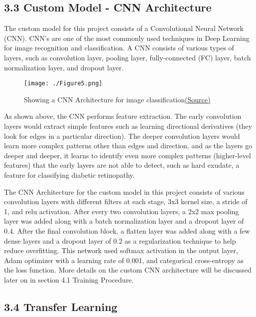\documentclass[
]{article}
\begin{document}
\hypertarget{custom-model---cnn-architecture}{%
\subsection{\texorpdfstring{\textbf{3.3 Custom Model - CNN
Architecture}}{3.3 Custom Model - CNN Architecture}}\label{custom-model---cnn-architecture}}

The custom model for this project consists of a Convolutional Neural
Network (CNN). CNN's are one of the most commonly used techniques in
Deep Learning for image recognition and classification. A CNN consists
of various types of layers, such as convolution layer, pooling layer,
fully-connected (FC) layer, batch normalization layer, and dropout
layer.

\begin{figure}[hbt!]
  \centering
  \texttt{[image: ./Figure5.png]}
  \caption{Showing a CNN Architecture for image classification\href{https://medium.com/techiepedia/binary-image-classifier-cnn-using-tensorflow-a3f5d6746697}{\underline{(Source)}}}
  \label{fig:figure5}
\end{figure}

As shown above, the CNN performs feature extraction. The early
convolution layers would extract simple features such as learning
directional derivatives (they look for edges in a particular direction).
The deeper convolution layers would learn more complex patterns other
than edges and direction, and as the layers go deeper and deeper, it
learns to identify even more complex patterns (higher-level features)
that the early layers are not able to detect, such as hard exudate, a
feature for classifying diabetic retinopathy.

The CNN Architecture for the custom model in this project consists of
various convolution layers with different filters at each stage, 3x3
kernel size, a stride of 1, and relu activation. After every two
convolution layers, a 2x2 max pooling layer was added along with a batch
normalization layer and a dropout layer of 0.4. After the final
convolution block, a flatten layer was added along with a few dense
layers and a dropout layer of 0.2 as a regularization technique to help
reduce overfitting. This network used softmax activation in the output
layer, Adam optimizer with a learning rate of 0.001, and categorical
cross-entropy as the loss function. More details on the custom CNN
architecture will be discussed later on in section 4.1 Training
Procedure.

\hypertarget{transfer-learning}{%
\subsection{\texorpdfstring{\textbf{3.4 Transfer
Learning}}{3.4 Transfer Learning}}\label{transfer-learning}}
\end{document}
